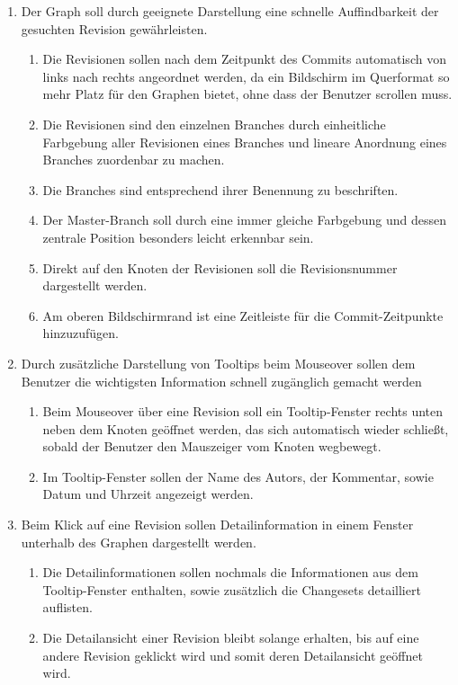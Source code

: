 \documentclass[nocolor]{tudbook}
\begin{document}
\begin{enumerate}[F1]
\item Der Graph soll durch geeignete Darstellung eine schnelle Auffindbarkeit der gesuchten Revision gewährleisten.
	\begin{enumerate}[{F1}.1]
	\item Die Revisionen sollen nach dem Zeitpunkt des Commits automatisch von links nach rechts angeordnet werden, da ein Bildschirm im Querformat so mehr Platz für den Graphen bietet, ohne dass der Benutzer scrollen muss.
	\item Die Revisionen sind den einzelnen Branches durch einheitliche Farbgebung aller Revisionen eines Branches und lineare Anordnung eines Branches zuordenbar zu machen.
	\item Die Branches sind entsprechend ihrer Benennung zu beschriften.
	\item Der Master-Branch soll durch eine immer gleiche Farbgebung und dessen zentrale Position besonders leicht erkennbar sein.
	\item Direkt auf den Knoten der Revisionen soll die Revisionsnummer dargestellt werden.
	\item Am oberen Bildschirmrand ist eine Zeitleiste für die Commit-Zeitpunkte hinzuzufügen.
	\end{enumerate}
\item Durch zusätzliche Darstellung von Tooltips beim Mouseover sollen dem Benutzer die wichtigsten Information schnell zugänglich gemacht werden
	\begin{enumerate}[{F2}.1]	
	\item Beim Mouseover über eine Revision soll ein Tooltip-Fenster rechts unten neben dem Knoten geöffnet werden, das sich automatisch wieder schließt, sobald der Benutzer den Mauszeiger vom Knoten wegbewegt.
	\item Im Tooltip-Fenster sollen der Name des Autors, der Kommentar, sowie Datum und Uhrzeit angezeigt werden.
	\end{enumerate}
\item Beim Klick auf eine Revision sollen Detailinformation in einem Fenster unterhalb des Graphen dargestellt werden.
	\begin{enumerate}[{F3}.1]	
	\item Die Detailinformationen sollen nochmals die Informationen aus dem Tooltip-Fenster enthalten, sowie zusätzlich die Changesets detailliert auflisten.
	\item Die Detailansicht einer Revision bleibt solange erhalten, bis auf eine andere Revision geklickt wird und somit deren Detailansicht geöffnet wird.
	\end{enumerate}
\end{enumerate}
\end{document}
